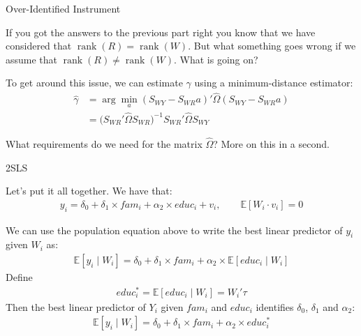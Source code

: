 \begin{frame}{Over-Identified Instrument}

    If you got the answers to the previous part right you know that we have considered that $\operatorname{rank}(R) = \operatorname{rank}(W)$. But what something goes wrong if we assume that $\operatorname{rank}(R) \neq \operatorname{rank}(W)$. What is going on?

    \vspace{2em}

    To get around this issue, we can estimate $\gamma$ using a minimum-distance estimator:
    \begin{align*}
        \hat{\gamma} &= \arg \min_a ( S_{WY} - S_{WR} a)' \hat{\Omega} (S_{WY} - S_{WR} a)
        \\
        &= \Biggr( S_{WR}' \hat{\Omega} S_{WR} \Biggr)^{-1} S_{WR}' \hat{\Omega} S_{WY}
    \end{align*}

    What requirements do we need for the matrix $\hat{\Omega}$? More on this in a second.
    
\end{frame}

\begin{frame}{2SLS}

    Let's put it all together. We have that:
    \begin{align*}
        y_i = \delta_0 + \delta_1 \times fam_i + \alpha_2 \times educ_i + v_i, \qquad \mathbb{E}[W_i \cdot v_i] = 0
    \end{align*}

    We can use the population equation above to write the best linear predictor of $y_i$ given $W_i$ as:
    \begin{align*}
        \mathbb{E}[y_i \mid W_i] = \delta_0 + \delta_1 \times fam_i + \alpha_2 \times \mathbb{E} [educ_i \mid W_i] 
    \end{align*}
    Define
    \begin{align*}
        educ_i^* = \mathbb{E}[educ_i \mid W_i] = W_i' \tau
    \end{align*}
    Then the best linear predictor of $Y_i$ given $fam_i$ and $educ_i$ identifies $\delta_0$, $\delta_1$ and $\alpha_2$:
    \begin{align*}
        \mathbb{E}[y_i \mid W_i] = \delta_0 + \delta_1 \times fam_i + \alpha_2 \times educ^*_i
    \end{align*}
    
\end{frame}